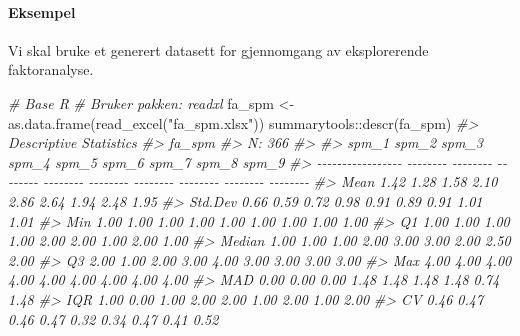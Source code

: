 \documentclass[
]{article}
\newenvironment{Shaded}{\begin{snugshade}}{\end{snugshade}}
\newcommand{\CommentTok}[1]{\textcolor[rgb]{0.56,0.35,0.01}{\textit{#1}}}
\newcommand{\FunctionTok}[1]{\textcolor[rgb]{0.00,0.00,0.00}{#1}}
\newcommand{\NormalTok}[1]{#1}
\newcommand{\OtherTok}[1]{\textcolor[rgb]{0.56,0.35,0.01}{#1}}
\newcommand{\SpecialCharTok}[1]{\textcolor[rgb]{0.00,0.00,0.00}{#1}}
\newcommand{\StringTok}[1]{\textcolor[rgb]{0.31,0.60,0.02}{#1}}
\begin{document}
\hypertarget{eksempel}{%
\paragraph{Eksempel}\label{eksempel}}

Vi skal bruke et generert datasett for gjennomgang av eksplorerende faktoranalyse.

\begin{Shaded}
\begin{Highlighting}[]
\CommentTok{\# Base R}
\CommentTok{\# Bruker pakken: readxl}
\NormalTok{fa\_spm }\OtherTok{\textless{}{-}} \FunctionTok{as.data.frame}\NormalTok{(}\FunctionTok{read\_excel}\NormalTok{(}\StringTok{"fa\_spm.xlsx"}\NormalTok{))}
\NormalTok{summarytools}\SpecialCharTok{::}\FunctionTok{descr}\NormalTok{(fa\_spm)}
\CommentTok{\#\textgreater{} Descriptive Statistics  }
\CommentTok{\#\textgreater{} fa\_spm  }
\CommentTok{\#\textgreater{} N: 366  }
\CommentTok{\#\textgreater{} }
\CommentTok{\#\textgreater{}                      spm\_1    spm\_2    spm\_3    spm\_4    spm\_5    spm\_6    spm\_7    spm\_8    spm\_9}
\CommentTok{\#\textgreater{} {-}{-}{-}{-}{-}{-}{-}{-}{-}{-}{-}{-}{-}{-}{-}{-}{-} {-}{-}{-}{-}{-}{-}{-}{-} {-}{-}{-}{-}{-}{-}{-}{-} {-}{-}{-}{-}{-}{-}{-}{-} {-}{-}{-}{-}{-}{-}{-}{-} {-}{-}{-}{-}{-}{-}{-}{-} {-}{-}{-}{-}{-}{-}{-}{-} {-}{-}{-}{-}{-}{-}{-}{-} {-}{-}{-}{-}{-}{-}{-}{-} {-}{-}{-}{-}{-}{-}{-}{-}}
\CommentTok{\#\textgreater{}              Mean     1.42     1.28     1.58     2.10     2.86     2.64     1.94     2.48     1.95}
\CommentTok{\#\textgreater{}           Std.Dev     0.66     0.59     0.72     0.98     0.91     0.89     0.91     1.01     1.01}
\CommentTok{\#\textgreater{}               Min     1.00     1.00     1.00     1.00     1.00     1.00     1.00     1.00     1.00}
\CommentTok{\#\textgreater{}                Q1     1.00     1.00     1.00     1.00     2.00     2.00     1.00     2.00     1.00}
\CommentTok{\#\textgreater{}            Median     1.00     1.00     1.00     2.00     3.00     3.00     2.00     2.50     2.00}
\CommentTok{\#\textgreater{}                Q3     2.00     1.00     2.00     3.00     4.00     3.00     3.00     3.00     3.00}
\CommentTok{\#\textgreater{}               Max     4.00     4.00     4.00     4.00     4.00     4.00     4.00     4.00     4.00}
\CommentTok{\#\textgreater{}               MAD     0.00     0.00     0.00     1.48     1.48     1.48     1.48     0.74     1.48}
\CommentTok{\#\textgreater{}               IQR     1.00     0.00     1.00     2.00     2.00     1.00     2.00     1.00     2.00}
\CommentTok{\#\textgreater{}                CV     0.46     0.47     0.46     0.47     0.32     0.34     0.47     0.41     0.52}

\end{Highlighting}
\end{Shaded}
\end{document}
